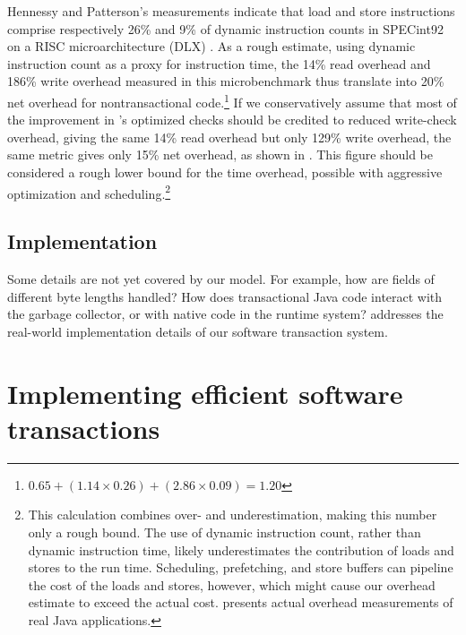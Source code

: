 
Hennessy and Patterson's measurements indicate that load and store
instructions comprise respectively 26\% and 9\% of dynamic instruction
counts in SPECint92 on a RISC microarchitecture (DLX)
\cite[p. 105]{HennessyPa96}.
As a rough estimate, using dynamic instruction count as a proxy for
instruction time,
the 14\% read overhead and 186\% write overhead measured
in this microbenchmark thus translate into 20\% net overhead for
nontransactional code.\footnote{$0.65 + (1.14 \times 0.26) + (2.86
  \times 0.09) = 1.20$} If we conservatively assume that most of the
improvement in 's optimized checks should be credited
to reduced write-check overhead, giving the same 14\% read overhead
but only 129\% write overhead, the same metric gives only 15\% net
overhead, as shown in .  This figure should be
considered a rough lower bound for the time overhead, possible with
aggressive optimization and scheduling.\footnote{This
  calculation combines over- and underestimation, making this number
  only a rough bound.  The use of dynamic instruction count, rather
  than dynamic instruction time, likely underestimates the
  contribution of loads and stores to the run time.
  Scheduling, prefetching, and store buffers can pipeline the cost of
  the loads and stores, however, which might cause our overhead estimate to
  exceed the actual cost.   presents actual
  overhead measurements of real Java applications.}

\section*{Implementation}
Some details are not yet covered by our model.
For example, how are fields of different byte lengths handled?  How does
transactional Java code interact with the garbage collector, or with
native code in the runtime system?   addresses the
real-world
implementation details of our software transaction system.

\chapter{Implementing efficient software transactions}\label{cha:stmimpl}

